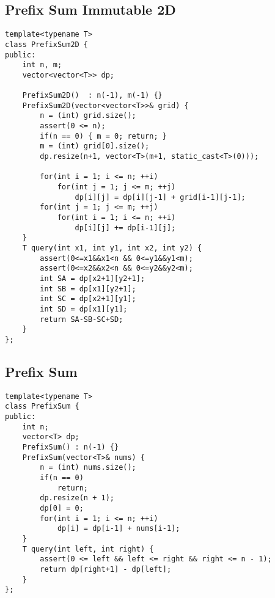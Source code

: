 \documentclass[10pt,letterpaper,twocolumn,twosided]{article}
\begin{document}
\subsection{Prefix Sum Immutable 2D}
\begin{lstlisting}
template<typename T>
class PrefixSum2D {
public:
    int n, m;
    vector<vector<T>> dp;

    PrefixSum2D()  : n(-1), m(-1) {}
    PrefixSum2D(vector<vector<T>>& grid) {
        n = (int) grid.size();
        assert(0 <= n);
        if(n == 0) { m = 0; return; }
        m = (int) grid[0].size();
        dp.resize(n+1, vector<T>(m+1, static_cast<T>(0)));
        
        for(int i = 1; i <= n; ++i)
            for(int j = 1; j <= m; ++j)
                dp[i][j] = dp[i][j-1] + grid[i-1][j-1];
        for(int j = 1; j <= m; ++j)
            for(int i = 1; i <= n; ++i)
                dp[i][j] += dp[i-1][j];
    }
    T query(int x1, int y1, int x2, int y2) {
        assert(0<=x1&&x1<n && 0<=y1&&y1<m);
        assert(0<=x2&&x2<n && 0<=y2&&y2<m);
        int SA = dp[x2+1][y2+1];
        int SB = dp[x1][y2+1];
        int SC = dp[x2+1][y1];
        int SD = dp[x1][y1];
        return SA-SB-SC+SD;
    }
};
\end{lstlisting}

\subsection{Prefix Sum}
\begin{lstlisting}
template<typename T>
class PrefixSum {
public:
    int n;
    vector<T> dp;
    PrefixSum() : n(-1) {}
    PrefixSum(vector<T>& nums) {
        n = (int) nums.size();
        if(n == 0)
            return;
        dp.resize(n + 1);
        dp[0] = 0;
        for(int i = 1; i <= n; ++i)
            dp[i] = dp[i-1] + nums[i-1];
    }
    T query(int left, int right) {
        assert(0 <= left && left <= right && right <= n - 1);
        return dp[right+1] - dp[left];
    }
};
\end{lstlisting}
\end{document}
